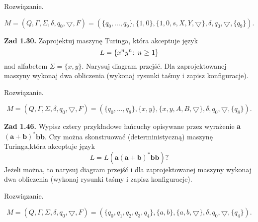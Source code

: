 \documentclass[12pt]{article}
\begin{document}
 Rozwiązanie.
 
\[M=(Q,\Gamma,\Sigma,\delta,q_0,\bigtriangledown,F)=(\{q_0,...,q_9\},\{1,0\},\{1,0,s,X,Y,\bigtriangledown\},\delta,q_0,\bigtriangledown,\{q_9\}).\]

\newpage

\noindent\textbf{Zad 1.30.} Zaprojektuj maszynę Turinga, która akceptuje język
\[L=\{\text{$x^ny^n$: \textit{n} $\geq$ 1}\}\]
nad alfabetem $\Sigma=\{x,y\}$. Narysuj diagram przejść. Dla zaprojektowanej maszyny wykonaj dwa obliczenia (wykonaj rysunki taśmy i zapisz konfiguracje).

 Rozwiązanie.
 
\[M=(Q,\Gamma,\Sigma,\delta,q_0,\bigtriangledown,F)=(\{q_0,...,q_8\},\{x,y\},\{x,y,A,B,\bigtriangledown\},\delta,q_0,\bigtriangledown,\{q_8\}).\]

\newpage

\noindent\textbf{Zad 1.46.} Wypisz cztery przykładowe łańcuchy opisywane przez wyrażenie \textbf{a}$(\textbf{a}+\textbf{b})^*$\textbf{bb}. Czy można skonstruować (deterministyczną) maszynę Turinga,która akceptuje język
\[L=L(\textbf{a}(\textbf{a}+\textbf{b})^*\textbf{bb})?\]
Jeżeli można, to narysuj diagram przejść i dla zaprojektowanej maszyny wykonaj dwa obliczenia (wykonaj rysunki taśmy i zapisz konfiguracje).

 Rozwiązanie.
 
\[M=(Q,\Gamma,\Sigma,\delta,q_0,\bigtriangledown,F)=(\{q_0,q_1,q_2,q_3,q_4\},\{a,b\},\{a,b,\bigtriangledown\},\delta,q_0,\bigtriangledown,\{q_4\}).\]

\begin{center}
\end{center}
\end{document}
